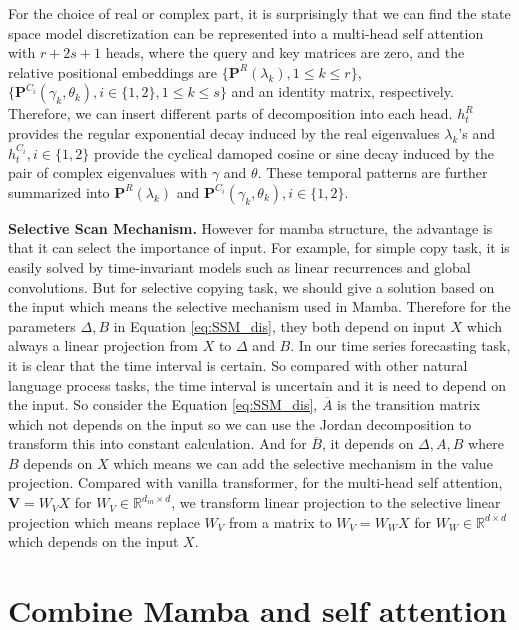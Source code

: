 For the choice of real or complex part, it is surprisingly that we can find the state space model discretization can be represented into a multi-head self attention with $r+2s+1$ heads, where the query and key matrices are zero, and the relative positional embeddings are $\{\mathbf{P}^R(\lambda_k),1 \leq k \leq r\}$, $\{\mathbf{P}^{C_i}(\gamma_k,\theta_k),i \in \{1,2\},1 \leq k \leq s\}$ and an identity matrix, respectively. Therefore, we can insert different parts of decomposition into each head. $h_t^R$ provides the regular exponential decay induced by the real eigenvalues $\lambda_k$'s and $h_t^{C_i},i\in \{1,2\}$ provide the cyclical damoped cosine or sine decay induced by the pair of complex eigenvalues with $\gamma$ and $\theta$. These temporal patterns are further summarized into $\mathbf{P}^R(\lambda_k)$ and $\mathbf{P}^{C_i}(\gamma_k,\theta_k),i \in \{1,2\}$.

\textbf{Selective Scan Mechanism.} However for mamba structure, the advantage is that it can select the importance of input. For example, for simple copy task, it is easily solved by time-invariant models such as linear recurrences and global convolutions. But for selective copying task, we should give a solution based on the input which means the selective mechanism used in Mamba. Therefore for the parameters $\Delta,B$ in Equation \ref{eq:SSM_dis}, they both depend on input $X$ which always a linear projection from $X$ to $\Delta$ and $B$. In our time series forecasting task, it is clear that the time interval is certain. So compared with other natural language process tasks, the time interval is uncertain and it is need to depend on the input. So consider the Equation \eqref{eq:SSM_dis}, $\overline{A}$ is the transition matrix which not depends on the input so we can use the Jordan decomposition to transform this into constant calculation. And for $\overline{B}$, it depends on $\Delta,A,B$ where $B$ depends on $X$ which means we can add the selective mechanism in the value projection. Compared with vanilla transformer, for the multi-head self attention, $\boldsymbol{V} = W_V X$ for $W_V \in \mathbb{R}^{d_{in} \times d}$, we transform linear projection to the selective linear projection which means replace $W_V$ from a matrix to $W_V = W_W X$ for $W_W \in \mathbb{R}^{d \times d}$ which depends on the input $X$.

\section{Combine Mamba and self attention}

